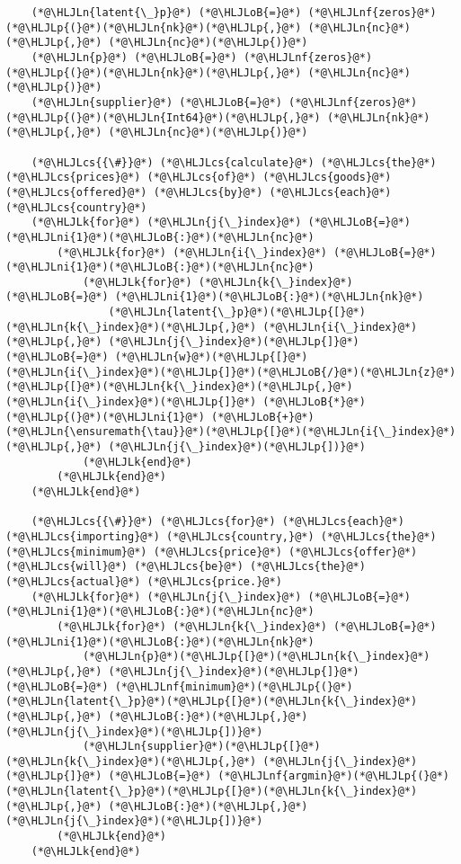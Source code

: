 \documentclass[12pt,a4paper]{article}
\newcommand{\HLJLk}[1]{\textcolor[RGB]{148,91,176}{\textbf{#1}}}
\newcommand{\HLJLn}[1]{#1}
\newcommand{\HLJLnf}[1]{\textcolor[RGB]{66,102,213}{#1}}
\newcommand{\HLJLni}[1]{\textcolor[RGB]{59,151,46}{#1}}
\newcommand{\HLJLoB}[1]{\textcolor[RGB]{102,102,102}{\textbf{#1}}}
\newcommand{\HLJLp}[1]{#1}
\newcommand{\HLJLcs}[1]{\textcolor[RGB]{153,153,119}{\textit{#1}}}
\begin{document}
\begin{lstlisting}
    (*@\HLJLn{latent{\_}p}@*) (*@\HLJLoB{=}@*) (*@\HLJLnf{zeros}@*)(*@\HLJLp{(}@*)(*@\HLJLn{nk}@*)(*@\HLJLp{,}@*) (*@\HLJLn{nc}@*)(*@\HLJLp{,}@*) (*@\HLJLn{nc}@*)(*@\HLJLp{)}@*)
    (*@\HLJLn{p}@*) (*@\HLJLoB{=}@*) (*@\HLJLnf{zeros}@*)(*@\HLJLp{(}@*)(*@\HLJLn{nk}@*)(*@\HLJLp{,}@*) (*@\HLJLn{nc}@*)(*@\HLJLp{)}@*)
    (*@\HLJLn{supplier}@*) (*@\HLJLoB{=}@*) (*@\HLJLnf{zeros}@*)(*@\HLJLp{(}@*)(*@\HLJLn{Int64}@*)(*@\HLJLp{,}@*) (*@\HLJLn{nk}@*)(*@\HLJLp{,}@*) (*@\HLJLn{nc}@*)(*@\HLJLp{)}@*)

    (*@\HLJLcs{{\#}}@*) (*@\HLJLcs{calculate}@*) (*@\HLJLcs{the}@*) (*@\HLJLcs{prices}@*) (*@\HLJLcs{of}@*) (*@\HLJLcs{goods}@*) (*@\HLJLcs{offered}@*) (*@\HLJLcs{by}@*) (*@\HLJLcs{each}@*) (*@\HLJLcs{country}@*)
    (*@\HLJLk{for}@*) (*@\HLJLn{j{\_}index}@*) (*@\HLJLoB{=}@*) (*@\HLJLni{1}@*)(*@\HLJLoB{:}@*)(*@\HLJLn{nc}@*)
        (*@\HLJLk{for}@*) (*@\HLJLn{i{\_}index}@*) (*@\HLJLoB{=}@*) (*@\HLJLni{1}@*)(*@\HLJLoB{:}@*)(*@\HLJLn{nc}@*)
            (*@\HLJLk{for}@*) (*@\HLJLn{k{\_}index}@*) (*@\HLJLoB{=}@*) (*@\HLJLni{1}@*)(*@\HLJLoB{:}@*)(*@\HLJLn{nk}@*)
                (*@\HLJLn{latent{\_}p}@*)(*@\HLJLp{[}@*)(*@\HLJLn{k{\_}index}@*)(*@\HLJLp{,}@*) (*@\HLJLn{i{\_}index}@*)(*@\HLJLp{,}@*) (*@\HLJLn{j{\_}index}@*)(*@\HLJLp{]}@*) (*@\HLJLoB{=}@*) (*@\HLJLn{w}@*)(*@\HLJLp{[}@*)(*@\HLJLn{i{\_}index}@*)(*@\HLJLp{]}@*)(*@\HLJLoB{/}@*)(*@\HLJLn{z}@*)(*@\HLJLp{[}@*)(*@\HLJLn{k{\_}index}@*)(*@\HLJLp{,}@*) (*@\HLJLn{i{\_}index}@*)(*@\HLJLp{]}@*) (*@\HLJLoB{*}@*) (*@\HLJLp{(}@*)(*@\HLJLni{1}@*) (*@\HLJLoB{+}@*) (*@\HLJLn{\ensuremath{\tau}}@*)(*@\HLJLp{[}@*)(*@\HLJLn{i{\_}index}@*)(*@\HLJLp{,}@*) (*@\HLJLn{j{\_}index}@*)(*@\HLJLp{])}@*)
            (*@\HLJLk{end}@*)
        (*@\HLJLk{end}@*)
    (*@\HLJLk{end}@*)

    (*@\HLJLcs{{\#}}@*) (*@\HLJLcs{for}@*) (*@\HLJLcs{each}@*) (*@\HLJLcs{importing}@*) (*@\HLJLcs{country,}@*) (*@\HLJLcs{the}@*) (*@\HLJLcs{minimum}@*) (*@\HLJLcs{price}@*) (*@\HLJLcs{offer}@*) (*@\HLJLcs{will}@*) (*@\HLJLcs{be}@*) (*@\HLJLcs{the}@*) (*@\HLJLcs{actual}@*) (*@\HLJLcs{price.}@*)
    (*@\HLJLk{for}@*) (*@\HLJLn{j{\_}index}@*) (*@\HLJLoB{=}@*) (*@\HLJLni{1}@*)(*@\HLJLoB{:}@*)(*@\HLJLn{nc}@*)
        (*@\HLJLk{for}@*) (*@\HLJLn{k{\_}index}@*) (*@\HLJLoB{=}@*) (*@\HLJLni{1}@*)(*@\HLJLoB{:}@*)(*@\HLJLn{nk}@*)
            (*@\HLJLn{p}@*)(*@\HLJLp{[}@*)(*@\HLJLn{k{\_}index}@*)(*@\HLJLp{,}@*) (*@\HLJLn{j{\_}index}@*)(*@\HLJLp{]}@*) (*@\HLJLoB{=}@*) (*@\HLJLnf{minimum}@*)(*@\HLJLp{(}@*)(*@\HLJLn{latent{\_}p}@*)(*@\HLJLp{[}@*)(*@\HLJLn{k{\_}index}@*)(*@\HLJLp{,}@*) (*@\HLJLoB{:}@*)(*@\HLJLp{,}@*) (*@\HLJLn{j{\_}index}@*)(*@\HLJLp{])}@*)
            (*@\HLJLn{supplier}@*)(*@\HLJLp{[}@*)(*@\HLJLn{k{\_}index}@*)(*@\HLJLp{,}@*) (*@\HLJLn{j{\_}index}@*)(*@\HLJLp{]}@*) (*@\HLJLoB{=}@*) (*@\HLJLnf{argmin}@*)(*@\HLJLp{(}@*)(*@\HLJLn{latent{\_}p}@*)(*@\HLJLp{[}@*)(*@\HLJLn{k{\_}index}@*)(*@\HLJLp{,}@*) (*@\HLJLoB{:}@*)(*@\HLJLp{,}@*) (*@\HLJLn{j{\_}index}@*)(*@\HLJLp{])}@*)
        (*@\HLJLk{end}@*)
    (*@\HLJLk{end}@*)


\end{lstlisting}
\end{document}
